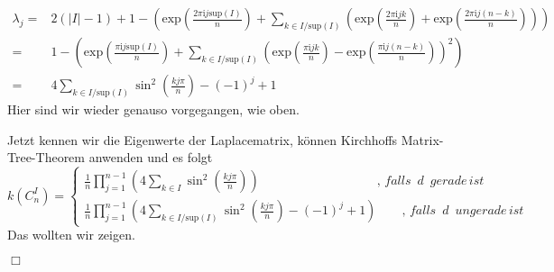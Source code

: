 \small
\begin{equation}
\begin{aligned}
 \lambda_j = {} & { 2(|I|-1)+1 - \left(\mathrm{exp}{\left(\frac{2\pi \mathrm{i}j \mathrm{sup}(I)}{n}\right)}+ \sum_{k\in I/\mathrm{sup}(I)}\left(\mathrm{exp}{\left(\frac{2\pi \mathrm{i}jk}{n}\right)}+ \mathrm{exp}{\left(\frac{2\pi \mathrm{i}j(n-k)}{n}\right)}\right)\right)}\\
  = {} &1-\left(\mathrm{exp}{\left(\frac{\pi \mathrm{i}j \mathrm{sup}(I)}{n}\right)} +\sum_{k\in I/\mathrm{sup}(I)}\left(\mathrm{exp}{\left(\frac{\pi \mathrm{i}jk}{n}\right)} - \mathrm{exp}{\left(\frac{\pi \mathrm{i}j(n-k)}{n}\right)}\right)^2\right)\\
  = {} & 4\sum_{k\in I/\mathrm{sup}(I)} \sin^2 \left( \frac{kj\pi}{n}\right)-(-1)^j+1
 \end{aligned}
\end{equation}
\normalsize
Hier sind wir wieder genauso vorgegangen, wie oben.\\
\par
\endgroup
Jetzt kennen wir die Eigenwerte der Laplacematrix, können Kirchhoffs Matrix-Tree-Theorem anwenden und es folgt
\begin{equation}
\mathit{k}\left( C_n^I \right) = 
 \begin{cases}
\frac{1}{n} \prod_{j=1}^{n-1} \left(4 \sum_{k \in I} \sin^2 \left( \frac{kj\pi}{n}\right) \right)\qquad\qquad\qquad\qquad\quad\; ,\,falls\,\,\,d\,\,\,gerade\,ist\\
\frac{1}{n} \prod_{j=1}^{n-1} \left(4 \sum_{k \in I/\mathrm{sup}(I)} \sin^2 \left( \frac{kj\pi}{n}\right)-(-1)^j+1\right)\qquad,\,falls\,\,\,d\,\,\,ungerade\,ist
\end{cases}
\end{equation}
Das wollten wir zeigen.
\begin{flushright} $\Box$ \end{flushright} 
\begin{Bsps}
\end{Bsps} 
